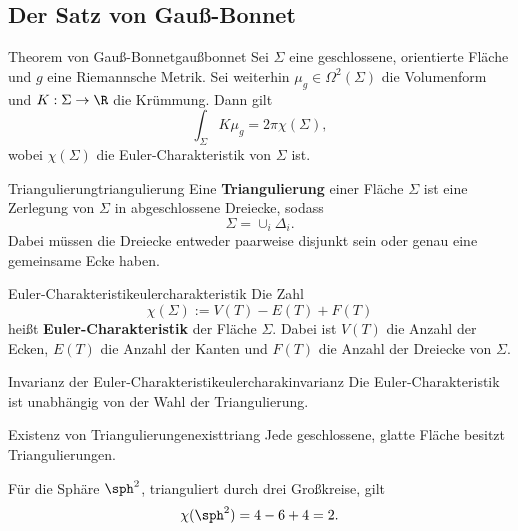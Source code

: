\subsection{Der Satz von Gauß-Bonnet}
\label{subsec:gaussbonnet}
\begin{theorem}{Theorem von Gauß-Bonnet}{gaußbonnet}
Sei $\Sigma$ eine geschlossene, orientierte Fläche und $g$ eine Riemannsche Metrik. Sei weiterhin $\mu_g \in \Omega^2(\Sigma)$ die Volumenform  und $K: \Sigma \to \R$ die Krümmung. Dann gilt
\begin{equation}
\int_\Sigma K \mu_g = 2 \pi \chi(\Sigma),
\end{equation}
wobei $\chi(\Sigma)$ die Euler-Charakteristik von $\Sigma$ ist.
\end{theorem}
\begin{definition}{Triangulierung}{triangulierung}
Eine \textbf{Triangulierung} einer Fläche $\Sigma$ ist eine Zerlegung von $\Sigma$ in abgeschlossene Dreiecke, sodass
\begin{equation}
\Sigma = \cup_i \Delta_i.
\end{equation}
Dabei müssen die Dreiecke entweder paarweise disjunkt sein oder genau eine gemeinsame Ecke haben.
\end{definition}
\begin{definition}{Euler-Charakteristik}{eulercharakteristik}
Die Zahl
\begin{equation}
\chi(\Sigma) := V(T)-E(T)+F(T)
\end{equation}
heißt \textbf{Euler-Charakteristik} der Fläche $\Sigma$. Dabei ist $V(T)$ die Anzahl der Ecken, $E(T)$ die Anzahl der Kanten und $F(T)$ die Anzahl der Dreiecke von $\Sigma$.
\end{definition}
\begin{satz}{Invarianz der Euler-Charakteristik}{eulercharakinvarianz}
Die Euler-Charakteristik ist unabhängig von der Wahl der Triangulierung.
\end{satz}
\begin{satz}{Existenz von Triangulierungen}{existtriang}
Jede geschlossene, glatte Fläche besitzt Triangulierungen.
\end{satz}
\begin{beispiel}
Für die Sphäre $\sph^2$, trianguliert durch drei Großkreise, gilt
\begin{equation}
\chi (\sph^2) = 4-6+4 = 2.
\end{equation}
\end{beispiel}
